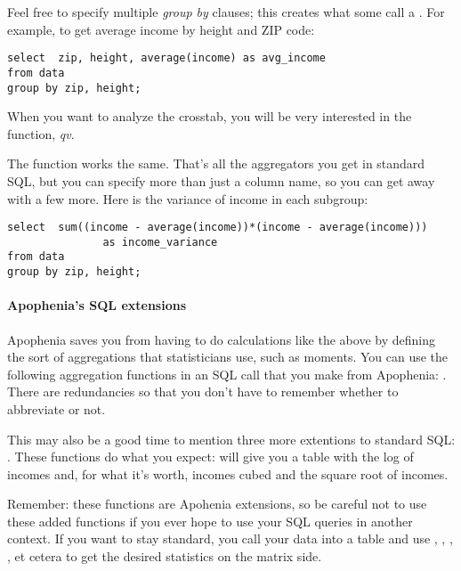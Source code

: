 Feel free to specify multiple {\sl group by} clauses; this creates what
some call a . For example, to get average income by
height and ZIP code: 
\begin{lstlisting}
select  zip, height, average(income) as avg_income
from data
group by zip, height;
\end{lstlisting}

When you want to analyze the crosstab, you will be very
interested in the  function, {\em qv}.

The function  works the same. That's all the aggregators you
get in standard SQL, but you can specify more than just a column name, so you can get
away with a few more. Here is the variance of income in each subgroup:
\begin{lstlisting}
select  sum((income - average(income))*(income - average(income))) 
               as income_variance
from data
group by zip, height;
\end{lstlisting}

\paragraph{Apophenia's SQL extensions}
Apophenia saves you from having to do calculations like the above by
defining the sort of aggregations that statisticians use, such as
moments. You can use the following aggregation functions in an SQL
call that you make from Apophenia: 
. There are redundancies so that you don't have to remember
whether to abbreviate or not.

This may also be a good time to mention three more extentions to
standard SQL: . These functions do what you
expect:  will give
you a table with the log of incomes and, for what it's worth, incomes
cubed and the square root of incomes.

Remember: these functions are Apohenia extensions, so be careful not to
use these added functions if you ever hope to use your SQL queries in
another context. If you want to stay standard, you call your data into
a table and use , ,
, , et cetera to get the desired
statistics on the matrix side.

